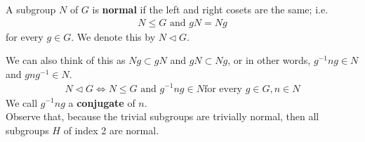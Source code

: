 \documentclass{memoir}
\begin{document}
\begin{defn}
	A subgroup \(N\) of \(G\) is \textbf{normal} if the left and right cosets are the same; i.e.
\begin{align*}
	N\leq G \text{ and }gN = Ng
\end{align*}
for every \(g \in G\). We denote this by \(N \triangleleft G\).
\end{defn}
We can also think of this as \(Ng \subset gN\) and \(gN \subset Ng\), or in other words, \(g^{-1}ng \in N\) and \(gng^{-1} \in N\).
\begin{align*}
	N \triangleleft G \iff N \leq G \text{ and } g^{-1}ng \in N \text{for every }g \in G, n \in N
\end{align*}
We call \(g^{-1}ng\) a \textbf{conjugate} of \(n\).\\

Observe that, because the trivial subgroups are trivially normal, then all subgroups \(H\) of index 2 are normal.
\end{document}
